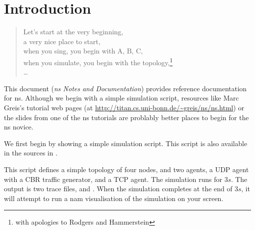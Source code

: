 
\chapter{Introduction}

\begin{quote}
Let's start at the very beginning, \\
a very nice place to start, \\
when you sing, you begin with A, B, C, \\
when you simulate, you begin with the topology,\footnote{%
with apologies to Rodgers and Hammerstein}\\
\ldots
\end{quote}

This document (\emph{ns Notes and Documentation}) provides reference
  documentation for ns.
Although we begin with a simple simulation script,
  resources like Marc Greis's tutorial web pages
  (at \url{http://titan.cs.uni-bonn.de/~greis/ns/ns.html})
  or the slides from one of the ns tutorials
  are problably better places to begin for the ns novice.

We first begin by showing a simple simulation script.
This script is also available in the sources in
.

This script defines a simple topology of four nodes,
and two agents, a UDP agent with a CBR traffic generator, and a TCP agent.
The simulation runs for $3s$.  The output is two trace files,
 and .
When the simulation completes at the end of $3s$,
it will attempt to run a nam visualisation of the simulation on your
screen.

